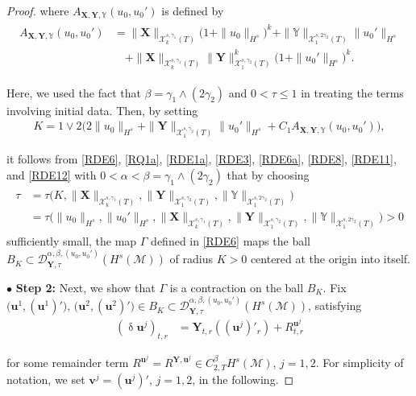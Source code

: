 \documentclass[letterpaper, 11pt,  reqno]{amsart}
\newcommand{\1}{\hspace{0.5mm}\textup{I}\hspace{0.5mm}}
\newcommand{\noi}{\noindent}
\newcommand{\bul}{\bullet}
\newcommand{\D}{\mathcal{D}}
\newcommand{\al}{\alpha}
\newcommand{\be}{\beta}
\newcommand{\updl}{\updelta}
\newcommand{\g}{\gamma}
\newcommand{\G}{\Gamma}
\newcommand{\les}{\lesssim}
\newcommand{\M}{\mathcal{M}}
\newcommand{\cX}{\mathcal{X}}
\newcommand{\uu}{\mathbf{u}}
\newcommand{\vv}{\mathbf{v}}
\newcommand{\YYb}{\mathbb{Y}}
\newcommand{\XX}{\mathbf{X}}
\newcommand{\YY}{\mathbf{Y}}
\numberwithin{equation}{section}
\numberwithin{theorem}{section}
\begin{document}
\begin{proof}
\noi
where $A_{\XX, \YY, \YYb}(u_0, u_0')$ is defined by 
\begin{align}
\begin{split}
A_{\XX, \YY, \YYb}(u_0, u_0')
& = \|\XX\|_{\cX^{s, \g_1}_k(T)}\big(1+ \|u_0\|_{H^s}\big)^{k}
+ \|\YYb\|_{\cX^{s, 2\g_2}_1(T)}\|u_0'\|_{H^s} \\
& \quad 
+ \|\XX\|_{\cX^{s, \g_1}_k(T)}
\|\YY\|_{\cX^{s, \g_2}_1(T)}^k
\big(1 + \|u_0'\|_{H^s}\big)^k.
\end{split}
\label{RDE12}
\end{align}


\noi
Here, we used the fact that 
$\be = \g_1 \wedge (2\g_2)$
and $0 < \tau \le 1$ in treating the terms involving
initial data.
Then, by setting
\begin{align}
K = 1\vee 
2\Big( 2 \|u_0\|_{H^s} + \| \YY\|_{\cX^{s, \g_2}_1(T)}\|u_0'\|_{H^s}  + C_1  A_{\XX, \YY, \YYb}(u_0, u_0')\Big), 
\label{RDE13}
\end{align}

\noi
it follows from \eqref{RDE6}, 
\eqref{RQ1a}, 
\eqref{RDE1a}, 
\eqref{RDE3}, 
 \eqref{RDE6a},
\eqref{RDE8}, 
\eqref{RDE11},
and \eqref{RDE12}
with 
 $0 < \al < \be = \g_1\wedge (2\g_2)$
that by 
 choosing 
\begin{align}
\begin{split}
\tau 
& = 
\tau\Big(K, \|\XX\|_{\cX^{s, \g_1}_k(T)}, 
 \| \YY\|_{\cX^{s, \g_2}_1(T)},
  \| \YYb\|_{\cX^{s, 2\g_2}_1(T)}\Big) \\
& = 
\tau\Big(\|u_0\|_{H^s}, 
\|u_0'\|_{H^s}, 
\|\XX\|_{\cX^{s, \g_1}_k(T)}, 
 \| \YY\|_{\cX^{s, \g_2}_1(T)},
  \| \YYb\|_{\cX^{s, 2\g_2}_1(T)}\Big) > 0
\end{split}
\label{RDE14}
\end{align}
sufficiently small, 
the map $\G$ defined in \eqref{RDE6} maps the ball $B_K\subset 
\D^{\al, \be, (u_0, u_0')}_{\YY, \tau}(H^s(\M))$
of radius $K > 0$ 
centered at the origin into itself.


\medskip

\noi
$\bul$ {\bf Step 2:}
Next, we show that $\G$ is a contraction
on the ball $B_K$.
Fix $\big(\uu^1, (\uu^1)'\big),
\, \big(\uu^2, (\uu^2)'\big)
\in B_K\subset 
\D^{\al, \be, (u_0, u_0')}_{\YY, \tau}(H^s(\M))$, 
satisfying
\begin{align}
 (\updl \uu^j)_{t, r} & = \YY_{t, r}((\uu^j)'_r) + R^{\uu^j}_{t, r}
\label{RDD1} 
\end{align}


\noi
for some remainder term
$R^{\uu^j} = R^{\YY,  \uu^j} \in   C^{\be}_{2, T} H^s(\M)$, $j = 1, 2$.
For simplicity of notation, 
we set $\vv^j = (\uu^j)'$, $j = 1, 2$, in the following.


\end{proof}
\end{document}
